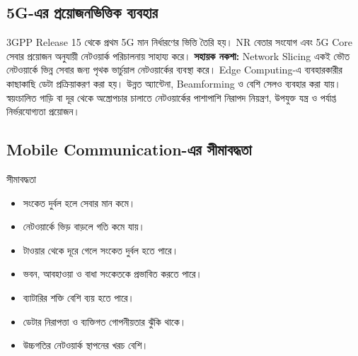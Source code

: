 \subsection{5G-এর প্রয়োজনভিত্তিক ব্যবহার}
3GPP Release 15 থেকে প্রথম 5G মান নির্ধারণের ভিত্তি তৈরি হয়। NR বেতার সংযোগ এবং 5G Core সেবার প্রয়োজন অনুযায়ী নেটওয়ার্ক পরিচালনায় সাহায্য করে।
\textbf{সহায়ক নকশা:} Network Slicing একই ভৌত নেটওয়ার্কে ভিন্ন সেবার জন্য পৃথক ভার্চুয়াল নেটওয়ার্কের ব্যবস্থা করে। Edge Computing-এ ব্যবহারকারীর কাছাকাছি ডেটা প্রক্রিয়াকরণ করা হয়। উন্নত অ্যান্টেনা, Beamforming ও বেশি সেলও ব্যবহার করা যায়। স্বয়ংচালিত গাড়ি বা দূর থেকে অস্ত্রোপচার চালাতে নেটওয়ার্কের পাশাপাশি নিরাপদ নিয়ন্ত্রণ, উপযুক্ত যন্ত্র ও পর্যাপ্ত নির্ভরযোগ্যতা প্রয়োজন।
\subsection{Mobile Communication-এর সীমাবদ্ধতা}

\begin{keypointbox}{সীমাবদ্ধতা}
\begin{itemize}
\item সংকেত দুর্বল হলে সেবার মান কমে।
\item নেটওয়ার্কে ভিড় বাড়লে গতি কমে যায়।
\item টাওয়ার থেকে দূরে গেলে সংকেত দুর্বল হতে পারে।
\item ভবন, আবহাওয়া ও বাধা সংকেতকে প্রভাবিত করতে পারে।
\item ব্যাটারির শক্তি বেশি ব্যয় হতে পারে।
\item ডেটার নিরাপত্তা ও ব্যক্তিগত গোপনীয়তার ঝুঁকি থাকে।
\item উচ্চগতির নেটওয়ার্ক স্থাপনের খরচ বেশি।
\end{itemize}
\end{keypointbox}


